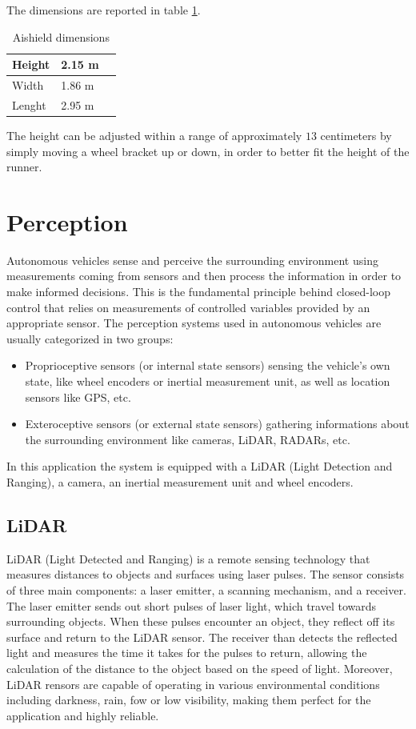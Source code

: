 \documentclass[a4paper,12pt,oneside]{book}
\begin{document}
The dimensions are reported in table \ref{tab:Shield_dimensions}.

\begin{table}[h]
\centering
\begin{tabular}{|p{1.5cm}|p{1.5cm}|p{1.5cm}|}
\hline
Height & 2.15 m \\
\hline
Width & 1.86 m \\
\hline
Lenght & 2.95 m \\
\hline
\end{tabular}
\caption{Aishield dimensions}
\label{tab:Shield_dimensions}
\end{table}
The height can be adjusted within a range of approximately $13$ centimeters by simply moving a wheel bracket up or down, in order to better fit the height of the runner.

\section{Perception}
Autonomous vehicles sense and perceive the surrounding environment using measurements coming from sensors and then process the information in order to make informed decisions. 
This is the fundamental principle behind closed-loop control that relies on measurements of controlled variables provided by an appropriate sensor.
The perception systems used in autonomous vehicles are usually categorized in two groups:
\begin{itemize}
    \item Proprioceptive sensors (or internal state sensors) sensing the vehicle's own state, like wheel encoders or inertial measurement unit, as well as location sensors like GPS, etc.
    \item Exteroceptive sensors (or external state sensors) gathering informations about the surrounding environment like cameras, LiDAR, RADARs, etc.
\end{itemize}
In this application the system is equipped with a LiDAR (Light Detection and Ranging), a camera, an inertial measurement unit and wheel encoders.

\subsection*{LiDAR}
LiDAR (Light Detected and Ranging) is a remote sensing technology that measures distances to objects and surfaces using laser pulses. 
The sensor consists of three main components: a laser emitter, a scanning mechanism, and a receiver.
The laser emitter sends out short pulses of laser light, which travel towards surrounding objects. 
When these pulses encounter an object, they reflect off its surface and return to the LiDAR sensor.
The receiver than detects the reflected light and measures the time it takes for the pulses to return, allowing the calculation of the distance to the object based on the speed of light.
Moreover, LiDAR rensors are capable of operating in various environmental conditions including darkness, rain, fow or low visibility, making them perfect for the application and highly reliable.
\end{document}
